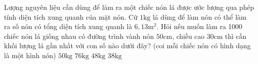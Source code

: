\begin{ex}
	Lượng nguyên liệu cần dùng để làm ra một chiếc nón lá được ước lượng qua phép tính diện tích xung quanh của mặt nón. Cứ $1 \mathrm{kg}$ lá dùng để làm nón có thể làm ra số nón có tổng diện tích xung quanh là $6,13 \mathrm{m}^2$. Hỏi nếu muốn làm ra 1000 chiếc nón lá giống nhau có đường trình vành nón $50 \mathrm{cm}$, chiều cao $30 \mathrm{cm}$ thì cần khối lượng lá gần nhất với con số nào dưới đây? (coi mỗi chiếc nón có hình dạng là một hình nón)
	\choice
	{\True $50 \mathrm{kg}$}
	{$76 \mathrm{kg}$}
	{$48 \mathrm{kg}$}
	{$38 \mathrm{kg}$}
\end{ex}
